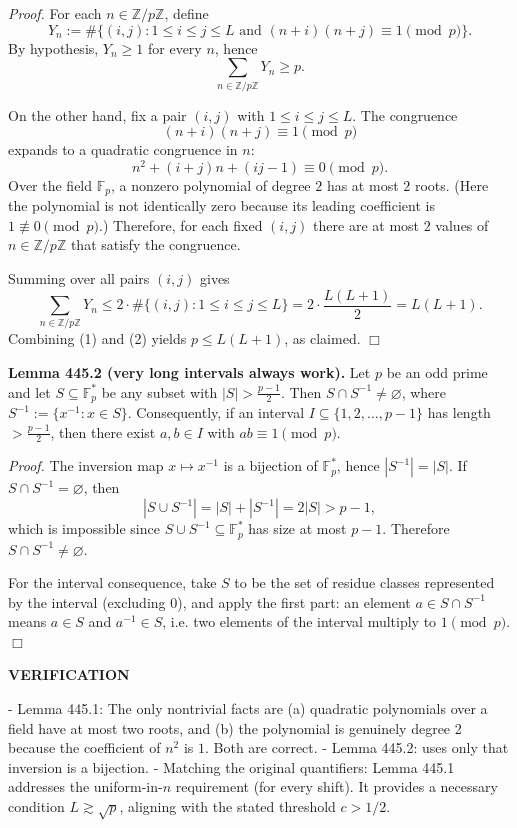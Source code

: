 \noindent\emph{Proof.}
For each $n\in\mathbb Z/p\mathbb Z$, define
\[
Y_n := \#\bigl\{(i,j): 1\le i\le j\le L\text{ and }(n+i)(n+j)\equiv 1\pmod p\bigr\}.
\]
By hypothesis, $Y_n\ge 1$ for every $n$, hence
\begin{equation}
\sum_{n\in\mathbb Z/p\mathbb Z} Y_n \ge p. \tag{1}
\end{equation}

On the other hand, fix a pair $(i,j)$ with $1\le i\le j\le L$. The congruence
\[(n+i)(n+j)\equiv 1\pmod p\]
expands to a quadratic congruence in $n$:
\[n^2 + (i+j)n + (ij-1)\equiv 0\pmod p.
\]
Over the field $\mathbb F_p$, a nonzero polynomial of degree $2$ has at most $2$ roots. (Here the polynomial is not identically zero because its leading coefficient is $1\not\equiv 0\pmod p$.) Therefore, for each fixed $(i,j)$ there are at most $2$ values of $n\in\mathbb Z/p\mathbb Z$ that satisfy the congruence.

Summing over all pairs $(i,j)$ gives
\[
\sum_{n\in\mathbb Z/p\mathbb Z} Y_n
\le 2\cdot \#\{(i,j): 1\le i\le j\le L\}
=2\cdot \frac{L(L+1)}{2}=L(L+1). \tag{2}
\]
Combining (1) and (2) yields $p\le L(L+1)$, as claimed. \hfill$\Box$

\medskip
\noindent\textbf{Lemma 445.2 (very long intervals always work).}
Let $p$ be an odd prime and let $S\subseteq\mathbb F_p^*$ be any subset with $|S|>\tfrac{p-1}{2}$. Then $S\cap S^{-1}\ne\varnothing$, where $S^{-1}:=\{x^{-1}:x\in S\}$.
Consequently, if an interval $I\subseteq\{1,2,\dots,p-1\}$ has length $>\tfrac{p-1}{2}$, then there exist $a,b\in I$ with $ab\equiv 1\pmod p$.

\noindent\emph{Proof.}
The inversion map $x\mapsto x^{-1}$ is a bijection of $\mathbb F_p^*$, hence $|S^{-1}|=|S|$.
If $S\cap S^{-1}=\varnothing$, then
\[|S\cup S^{-1}| = |S|+|S^{-1}| = 2|S| > p-1,
\]
which is impossible since $S\cup S^{-1}\subseteq\mathbb F_p^*$ has size at most $p-1$.
Therefore $S\cap S^{-1}\ne\varnothing$.

For the interval consequence, take $S$ to be the set of residue classes represented by the interval (excluding $0$), and apply the first part: an element $a\in S\cap S^{-1}$ means $a\in S$ and $a^{-1}\in S$, i.e. two elements of the interval multiply to $1\pmod p$. \hfill$\Box$

\medskip
\noindent\textbf{VERIFICATION}

- Lemma 445.1: The only nontrivial facts are (a) quadratic polynomials over a field have at most two roots, and (b) the polynomial is genuinely degree 2 because the coefficient of $n^2$ is $1$. Both are correct.
- Lemma 445.2: uses only that inversion is a bijection.
- Matching the original quantifiers: Lemma 445.1 addresses the uniform-in-$n$ requirement (for every shift). It provides a necessary condition $L\gtrsim\sqrt p$, aligning with the stated threshold $c>1/2$.

